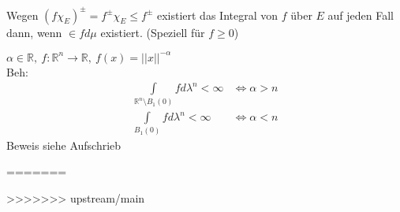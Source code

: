 \documentclass[11pt,a4paper,fleqn,openany]{report}
\begin{document}
    \begin{remark}
      Wegen $(f \chi_E)^{\pm} = f^{\pm} \chi_E \leq f^{\pm}$ existiert das Integral von $f$ über $E$ auf jeden Fall dann, wenn $\in f d\mu$ existiert. (Speziell für $f \geq 0$)
    \end{remark}

    \begin{example}
      $\alpha \in \mathbb{R}, \ f:\mathbb{R}^n \to \mathbb{R}, \ f(x) = ||x||^{-\alpha}$\\
      Beh: 
      \begin{align*}
        \int\limits_{\mathbb{R}^n \setminus B_1(0)} f d\lambda^n < \infty &\Leftrightarrow \alpha > n\\
        \int\limits_{B_1(0)} f d\lambda^n < \infty &\Leftrightarrow \alpha < n
      \end{align*}
      Beweis siehe Aufschrieb
    \end{example}
=======
  
  
  
  
  
  
>>>>>>> upstream/main
\end{document}
